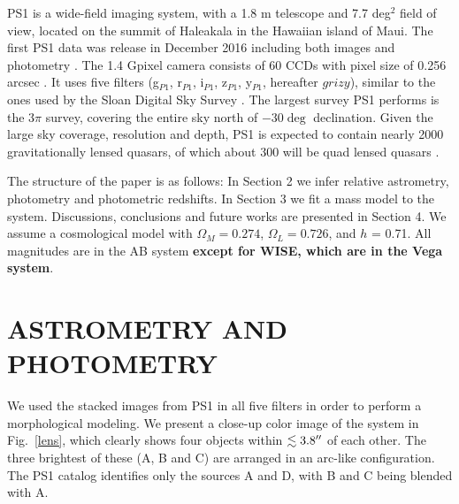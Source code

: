\documentclass[manuscript]{aastex}
\begin{document}
PS1 is a wide-field imaging system, with a 1.8 m telescope and 7.7 deg$^2$ field of view, located on the summit of Haleakala in the Hawaiian island of Maui. The first PS1 data was release in December 2016 including both images and photometry \citep[see][]{cha16}. The 1.4 Gpixel camera consists of 60 CCDs with pixel size of 0.256 arcsec \citep{ona08, ton09}. It uses five filters (g$_{P1}$, r$_{P1}$, i$_{P1}$, z$_{P1}$, y$_{P1}$, hereafter $grizy$), similar to the ones used by the Sloan Digital Sky Survey \citep[SDSS;][]{york00}. The largest survey PS1 performs is the 3$\pi$ survey, covering the entire sky north of $-30\deg$ declination. Given the large sky coverage, resolution and depth, PS1 is expected to contain nearly 2000 gravitationally lensed quasars, of which about 300 will be quad lensed quasars \citep{ogu10}.
 
The structure of the paper is as follows:
In Section 2 we infer relative astrometry, photometry and photometric redshifts. In Section 3 we fit a mass model to the system. Discussions, conclusions and future works are presented in Section 4. We assume a cosmological model with $\Omega_M = 0.274$, $\Omega_L = 0.726$, and $h$ = 0.71. All magnitudes are in the AB system {\bf except for WISE, which are in the Vega system}. 

\section{ASTROMETRY AND PHOTOMETRY}


We used the stacked images from PS1 in all five filters in order to perform a morphological modeling. We present a close-up color image of the system in Fig.~\ref{lens}, which clearly shows four objects within $\lesssim 3.8\mbox{$^{\prime\prime}$}$ of each other. The three brightest of these (A, B and C) are arranged in an arc-like configuration. The PS1 catalog identifies only the sources A and D, with B and C being blended with A. 
\end{document}
